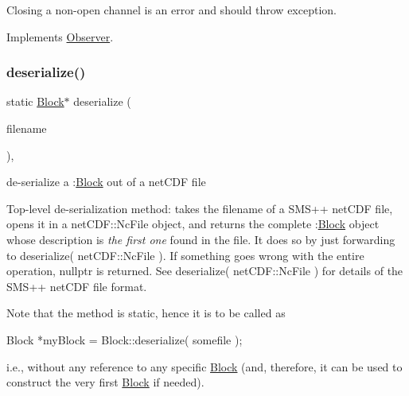 Closing a non-\/open channel is an error and should throw exception. 

Implements \mbox{\hyperlink{class_s_m_spp__di__unipi__it_1_1_observer_ae807c62016502d692338e1ab6578fc76}{Observer}}.

\mbox{\label{class_s_m_spp__di__unipi__it_1_1_block_a4210de3b3b076cf4273eaee2b916da84}} 
\subsubsection{\texorpdfstring{deserialize()}{deserialize()}\hspace{0.1cm}{\footnotesize\ttfamily [1/3]}}
{\footnotesize\ttfamily static \mbox{\hyperlink{class_s_m_spp__di__unipi__it_1_1_block}{Block}}$\ast$ deserialize (\begin{DoxyParamCaption}\item[{const char $\ast$}]{filename }\end{DoxyParamCaption})\hspace{0.3cm}{\ttfamily [inline]}, {\ttfamily [static]}}



de-\/serialize a \+:\mbox{\hyperlink{class_s_m_spp__di__unipi__it_1_1_block}{Block}} out of a net\+C\+DF file 

Top-\/level de-\/serialization method\+: takes the filename of a S\+M\+S++ net\+C\+DF file, opens it in a net\+C\+D\+F\+::\+Nc\+File object, and returns the complete \+:\mbox{\hyperlink{class_s_m_spp__di__unipi__it_1_1_block}{Block}} object whose description is {\itshape the first one} found in the file. It does so by just forwarding to deserialize( net\+C\+D\+F\+::\+Nc\+File ). If something goes wrong with the entire operation, nullptr is returned. See deserialize( net\+C\+D\+F\+::\+Nc\+File ) for details of the S\+M\+S++ net\+C\+DF file format.

Note that the method is static, hence it is to be called as \begin{DoxyVerb}  Block *myBlock = Block::deserialize( somefile );
\end{DoxyVerb}


i.\+e., without any reference to any specific \mbox{\hyperlink{class_s_m_spp__di__unipi__it_1_1_block}{Block}} (and, therefore, it can be used to construct the very first \mbox{\hyperlink{class_s_m_spp__di__unipi__it_1_1_block}{Block}} if needed).

